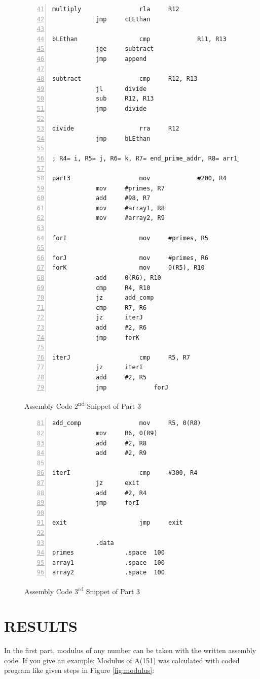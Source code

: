 \documentclass[pdftex,12pt,a4paper]{article}
\begin{document}
\begin{figure}[H]
    \centering
\begin{lstlisting}[language={[x86masm]Assembler}, numbers=left, firstnumber=41]
multiply    	        rla		R12
			jmp		cLEthan

bLEthan	    	        cmp 	        R11, R13
			jge		subtract
			jmp		append

subtract    	        cmp		R12, R13
			jl		divide
			sub		R12, R13
			jmp		divide

divide	    	        rra		R12
			jmp		bLEthan

; R4= i, R5= j, R6= k, R7= end_prime_addr, R8= arr1_ptr, R9= arr2_ptr, R10= tmp

part3	    	        mov 	        #200, R4
			mov		#primes, R7
			add		#98, R7
			mov		#array1, R8
			mov		#array2, R9

forI	    	        mov		#primes, R5

forJ	    	        mov		#primes, R6
forK	    	        mov		0(R5), R10
			add		0(R6), R10
			cmp		R4, R10
			jz		add_comp
			cmp		R7, R6
			jz		iterJ
			add		#2, R6
			jmp		forK

iterJ	    	        cmp		R5, R7
			jz		iterI
			add		#2, R5
			jmp 	        forJ\end{lstlisting}
    \caption{Assembly Code 2\textsuperscript{nd} Snippet of Part 3}
    \label{code:part3_2}
\end{figure}
			
\begin{figure}[H]
    \centering
\begin{lstlisting}[language={[x86masm]Assembler}, numbers=left, firstnumber=81]
add_comp    	        mov		R5, 0(R8)
			mov		R6, 0(R9)
			add		#2, R8
			add		#2, R9

iterI	    	        cmp		#300, R4
			jz		exit
			add		#2, R4
			jmp		forI

exit                    jmp		exit

			.data
primes		        .space	100
array1		        .space	100
array2		        .space	100
\end{lstlisting}
    \caption{Assembly Code 3\textsuperscript{rd} Snippet of Part 3}
    \label{code:part3_3}
\end{figure}

\section{RESULTS}
In the first part, modulus of any number can be taken with the written assembly code. If you give an example: Modulus of A(151) was calculated with coded program like given steps in Figure \ref{fig:modulus}:
\end{document}
